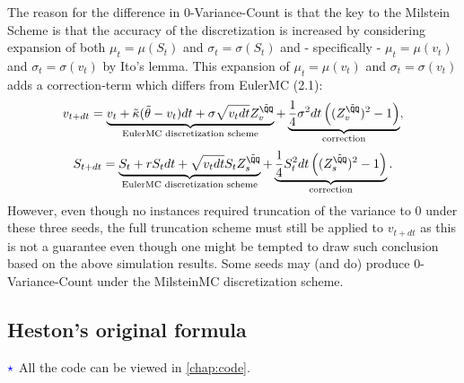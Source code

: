 \documentclass[11pt]{article}
\numberwithin{equation}{section}
\begin{document}
The reason for the difference in $0$-Variance-Count
is that the key to the Milstein Scheme is that the accuracy of the
discretization is increased by considering expansion of both $\mu_t=\mu(S_t)$ and
$\sigma_t=\sigma(S_t)$ and - specifically -  $\mu_t=\mu(v_t)$ and
$\sigma_t=\sigma(v_t)$ by Ito's lemma. This expansion of $\mu_t=\mu(v_t)$ and
$\sigma_t=\sigma(v_t)$ adds a correction-term which differs
from EulerMC (2.1):
\begin{align*}
    v_{t+dt} = \underbrace{v_t +\tilde{\kappa}(\tilde{\theta} - v_t)dt + \sigma \sqrt{v_tdt}Z_v^{\tilde{\QQ}}}_{\text{EulerMC discretization scheme}}+\underbrace{\frac{1}{4}\sigma^2dt\left ((Z_v^{{\tilde{\QQ}}})^2-1 \right )}_{\text{correction}},
\end{align*}
\begin{align*}
    S_{t+dt} = \underbrace{S_t + rS_tdt + \sqrt{v_t dt}S_tZ_s^{\tilde{\QQ}}}_{\text{EulerMC discretization scheme}}+\underbrace{\frac{1}{4}S_t^2dt\left( (Z_s^{\tilde{\QQ}})^2-1 \right )}_{\text{correction}}.
\end{align*}
However, even though no instances required truncation of the variance to $0$ under these three seeds, the full
truncation scheme must still be applied to $v_{t+dt}$ as this is not a
guarantee even though one might be tempted to draw such conclusion based on the
above simulation results. Some seeds may (and do) produce $0$-Variance-Count
under the MilsteinMC discretization scheme.
\newpage
\subsection{Heston’s original formula}
$\textcolor{blue}{\star}$ All the code can be viewed in \autoref{chap:code}.
\end{document}
